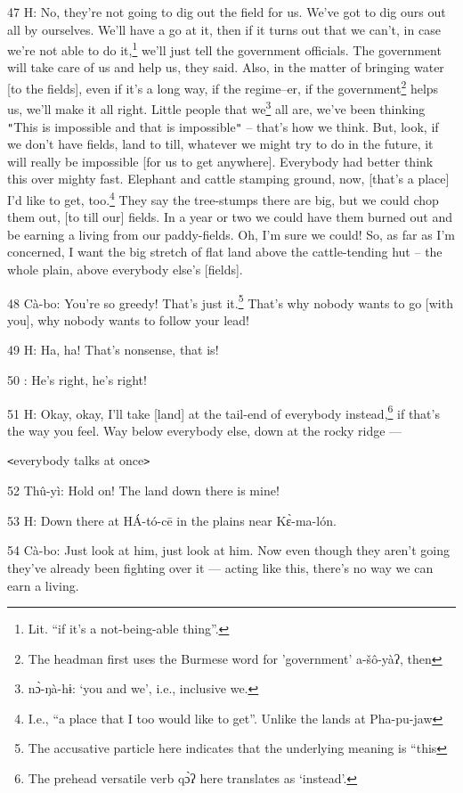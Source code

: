 {47 H: No, they're not going to dig out the field for us. We've got to dig ours
out all by ourselves. We'll have a go at it, then if it turns out that we can't,
in case we're not able to do it,\footnote{Lit. ``if it's a not-being-able thing''.} we'll just tell the government officials.
The government will take care of us and help us, they said. Also, in the matter
of bringing water [to the fields], even if it's a long way, if the regime--er,
if the government\footnote{The headman first uses the Burmese word for 'government' a-šô-yàʔ, then} helps us, we'll make it all right. Little people that we\footnote{nɔ̀-ŋà-hɨ: `you and we', i.e., inclusive we.}
all are, we've been thinking \texttt{"}This is impossible and that is impossible\texttt{"}
-- that's how we think. But, look, if we don't have fields, land to till, whatever
we might try to do in the future, it will really be impossible [for us to get anywhere].
Everybody had better think this over mighty fast. Elephant and cattle stamping
ground, now, [that's a place] I'd like to get, too.\footnote{I.e., ``a place that I too would like to get''. Unlike the lands at Pha-pu-jaw} They say the tree-stumps
there are big, but we could chop them out, [to till our] fields. In a year or two
we could have them burned out and be earning a living from our paddy-fields. Oh,
I'm sure we could! So, as far as I'm concerned, I want the big stretch of flat
land above the cattle-tending hut -- the whole plain, above everybody else's [fields].

48 Cà-bo: You're so greedy! That's just it.\footnote{The accusative particle here indicates that the underlying meaning is ``this} That's why nobody wants to go
[with you], why nobody wants to follow your lead!

49 H: Ha, ha! That's nonsense, that is!

50      : He's right, he's right!

51 H: Okay, okay, I'll take [land] at the tail-end of everybody instead,\footnote{The prehead versatile verb qɔ̀ʔ here translates as `instead'.} if
that's the way you feel. Way below everybody else, down at the rocky ridge ---

\texttt{<}everybody talks at once\texttt{>}

52 Thû-yì: Hold on! The land down there is mine!

53 H: Down there at HÁ-tó-cē in the plains near Kɛ̀-ma-lón.

54 Cà-bo: Just look at him, just look at him. Now even though they aren't going
they've already been fighting over it --- acting like this, there's no way we can
earn a living.

}
